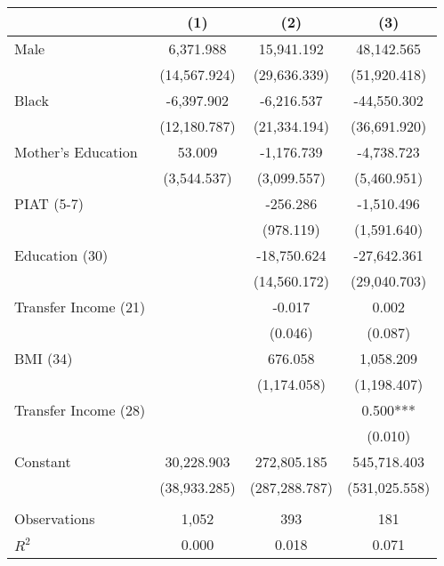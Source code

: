 \begin{tabular}{lccc} \toprule
 & (1) & (2) & (3) \\ \midrule 
Male & 6,371.988 & 15,941.192 & 48,142.565 \\
 & (14,567.924) & (29,636.339) & (51,920.418) \\
Black & -6,397.902 & -6,216.537 & -44,550.302 \\
 & (12,180.787) & (21,334.194) & (36,691.920) \\
 Mother's Education & 53.009 & -1,176.739 & -4,738.723 \\
 & (3,544.537) & (3,099.557) & (5,460.951) \\
PIAT (5-7) &  & -256.286 & -1,510.496 \\
 &  & (978.119) & (1,591.640) \\
Education (30) &  & -18,750.624 & -27,642.361 \\
 &  & (14,560.172) & (29,040.703) \\
Transfer Income (21) &  & -0.017 & 0.002 \\
 &  & (0.046) & (0.087) \\
BMI (34) &  & 676.058 & 1,058.209 \\
 &  & (1,174.058) & (1,198.407) \\
Transfer Income (28) &  &  & 0.500*** \\
 &  &  & (0.010) \\
Constant & 30,228.903 & 272,805.185 & 545,718.403 \\
 & (38,933.285) & (287,288.787) & (531,025.558) \\ \\ \midrule
Observations & 1,052 & 393 & 181 \\
$R^2$ & 0.000 & 0.018 & 0.071 \\ \bottomrule
\end{tabular}
